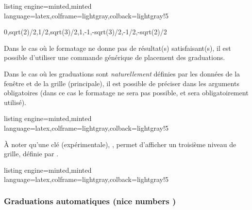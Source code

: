 \documentclass[11pt,a4paper]{ltxdoc}
\begin{document}
\begin{tcblisting}{listing engine=minted,minted language=latex,colframe=lightgray,colback=lightgray!5}
\begin{GraphiqueTikz}%
  [x=2.75cm,y=3cm,
  Xmin=0,Xmax=3.5,Xgrille=pi/12,Xgrilles=pi/24,
  Ymin=-1.05,Ymax=1.05,Ygrille=0.2,Ygrilles=0.05]
    {0,sqrt(2)/2,1/2,sqrt(3)/2,1,-1,-sqrt(3)/2,-1/2,-sqrt(2)/2}
\end{GraphiqueTikz}
\end{tcblisting}

Dans le cas où le formatage ne donne pas de résultat(s) satisfaisant(s), il est possible d'utiliser une commande générique de placement des graduations.

\pagebreak

Dans le cas où les graduations sont \textit{naturellement} définies par les données de la fenêtre et de la grille (principale), il est possible de préciser  dans les arguments obligatoires (dans ce cas le formatage ne sera pas possible, et  sera obligatoirement utilisé).

\begin{tcblisting}{listing engine=minted,minted language=latex,colframe=lightgray,colback=lightgray!5}
\begin{GraphiqueTikz}%
  [x=1.5cm,y=6cm,Xmin=0,Xmax=7,Xgrille=0.5,Xgrilles=0.25,
  Ymin=0,Ymax=1,Ygrille=0.1,Ygrilles=0.05]
\end{GraphiqueTikz}
\end{tcblisting}

À noter qu'une clé (expérimentale), , permet d'afficher un troisième niveau de grille, définie par \MontreCode{[Xgrillei=...,Ygrillei=...]}.

\begin{tcblisting}{listing engine=minted,minted language=latex,colframe=lightgray,colback=lightgray!5}
\begin{GraphiqueTikz}%
  [x=1.5cm,y=6cm,Xmin=0,Xmax=7,Xgrille=0.5,Xgrillei=0.25,Xgrilles=0.05,
  Ymin=0,Ymax=1,Ygrille=0.1,Ygrillei=0.05,Ygrilles=0.01]
\end{GraphiqueTikz}
\end{tcblisting}

\subsubsection{Graduations automatiques (\og nice numbers \fg{})}\label{gradsauto}
\end{document}
